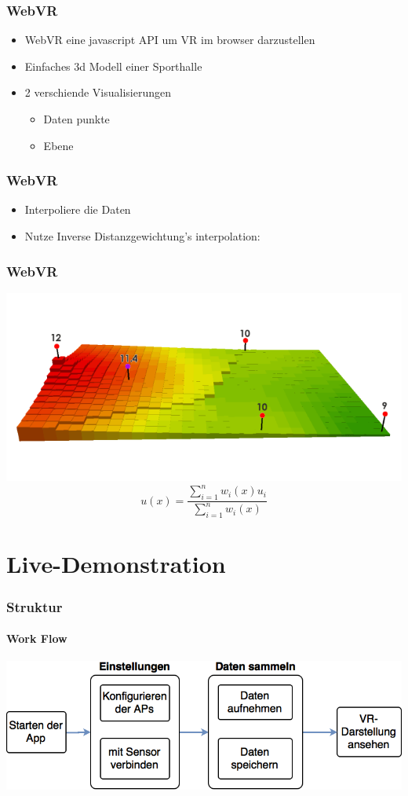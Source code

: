 \documentclass{beamer}
\begin{document}
\begin{frame}
\frametitle{WebVR}
\begin{itemize}
  \item WebVR eine javascript API um VR im browser darzustellen \pause
  \item Einfaches 3d Modell einer Sporthalle \pause
  \item 2 verschiende Visualisierungen
  \begin{itemize}
    \item Daten punkte
    \item Ebene
  \end{itemize}
\end{itemize}
\end{frame}

\begin{frame}
\frametitle{WebVR}
\begin{itemize}
  \item Interpoliere die Daten \pause
  \item Nutze Inverse Distanzgewichtung's interpolation:
\end{itemize}
\end{frame}

\begin{frame}
\frametitle{WebVR}
  \includegraphics[scale=0.5]{IDW.png}
  \pause
  $$
  u(x) = \frac{\sum_{i=1}^n w_i(x)u_i}{\sum_{i=1}^n w_i(x)}
  $$
\end{frame}


\section{Live-Demonstration}

\begin{frame}
\frametitle{Struktur}
\framesubtitle{Work Flow}
	\includegraphics[width=\textwidth]{diagram/workflow.png}
\end{frame}
\end{document}
